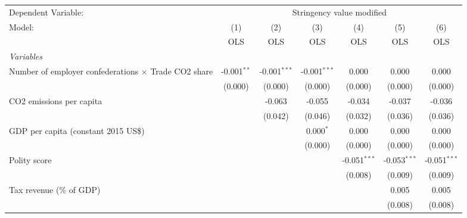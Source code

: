 
\begingroup
\centering
\begin{tabular}{lcccccc}
   \toprule
   Dependent Variable: & \multicolumn{6}{c}{Stringency value modified}\\
   Model:                                                      & (1)           & (2)            & (3)            & (4)            & (5)            & (6)\\  
                                                               &  OLS          & OLS            & OLS            & OLS            & OLS            & OLS\\  
   \midrule
   \emph{Variables}\\
   Number of employer confederations $\times$ Trade CO2 share  & -0.001$^{**}$ & -0.001$^{***}$ & -0.001$^{***}$ & 0.000          & 0.000          & 0.000\\   
                                                               & (0.000)       & (0.000)        & (0.000)        & (0.000)        & (0.000)        & (0.000)\\   
   CO2 emissions per capita                                    &               & -0.063         & -0.055         & -0.034         & -0.037         & -0.036\\   
                                                               &               & (0.042)        & (0.046)        & (0.032)        & (0.036)        & (0.036)\\   
   GDP per capita (constant 2015 US\$)                         &               &                & 0.000$^{*}$    & 0.000          & 0.000          & 0.000\\   
                                                               &               &                & (0.000)        & (0.000)        & (0.000)        & (0.000)\\   
   Polity score                                                &               &                &                & -0.051$^{***}$ & -0.053$^{***}$ & -0.051$^{***}$\\   
                                                               &               &                &                & (0.008)        & (0.009)        & (0.009)\\   
   Tax revenue (\% of GDP)                                     &               &                &                &                & 0.005          & 0.005\\   
                                                               &               &                &                &                & (0.008)        & (0.008)\\   

\end{tabular}
